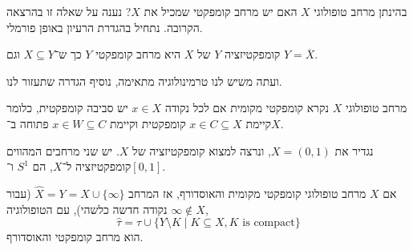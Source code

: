 בהינתן מרחב טופולוגי $X$ האם יש מרחב קומפקטי שמכיל את $X$?
נענה על שאלה זו בהרצאה הקרובה.
נתחיל בהגדרת הרעיון באופן פורמלי.
\begin{definition}[קומפקטיזציה]
	קומפקטיזציה $Y$ של $X$ היא מרחב קומפקטי $Y$ כך ש־$X \subseteq Y$ וגם $Y = \overline{X}$.
\end{definition}
ועתה משיש לנו טרמינולוגיה מתאימה, נוסיף הגדרה שתעזור לנו.
\begin{definition}
	מרחב טופולוגי $X$ נקרא קומפקטי מקומית אם לכל נקודה $x \in X$ יש סביבה קומפקטית,
	כלומר קיימת $x \in C \subseteq X$ קומפקטית וקיימת $x \in W \subseteq C$ פתוחה ב־$X$.
\end{definition}
\begin{example}
	נגדיר את $X = (0, 1)$, ונרצה למצוא קומפקטיזציה של $X$.
	יש שני מרחבים המהווים קומפקטיזציה ל־$X$, הם $S^1$ ו־$[0, 1]$.
\end{example}
\begin{theorem}
	אם $X$ מרחב טופולוגי קומפקטי מקומית והאוסדורף,
	אז המרחב $\hat{X} = Y = X \cup \{ \infty \}$ (עבור $\infty \notin X$ נקודה חדשה כלשהי),
	עם הטופולוגיה,
	\[
		\hat{\tau}
		= \tau \cup \{ Y \setminus K \mid K \subseteq X, K \text{ is compact} \}
	\]
	הוא מרחב קומפקטי והאוסדורף.
\end{theorem}
